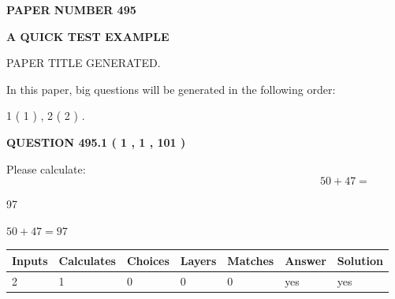 \documentclass[12pt]{article}
\begin{document}
   
   
   
 {\textbf{ \Large{ PAPER NUMBER  495  }}}
   
   
\vspace{0.2in}
   
   
   
   
   
   
   
   
 \vspace{0.2in}
{\LARGE {\textbf{ A QUICK TEST EXAMPLE}}}
   
   
 PAPER TITLE GENERATED.
   
   
   
\vspace{0.2in}
   
In this paper, big questions will be generated in the following order: 
   
   
   1 ( 1 )
 ,
   2 ( 2 )
 .
  
\vspace{0.2in}
  
{\textbf{\Large{QUESTION
495.1 
 ( 1 , 1 , 101 )
}}}
  
  
 
Please calculate:
\begin{equation}
50 +  %
47 = \nonumber
\end{equation}
 
 
 
\noindent{}
 
 

97
 
 
\noindent{}
 
 

 
 
 
\noindent{}
 
 

$ %
50 +  %
47=   %
97$
 
 
\noindent{}
 
 

 
   
   
   
   
\noindent\begin{tabular}{|l|l|l|l|l|l|l|}
 \hline
Inputs & Calculates & Choices & Layers & Matches & Answer & Solution \\ \hline
 2  & 
 1  & 
 0
  & 
 0  & 
 0  & 
  yes & 
  yes 
  \\ \hline
 \end{tabular}
   
\end{document}
